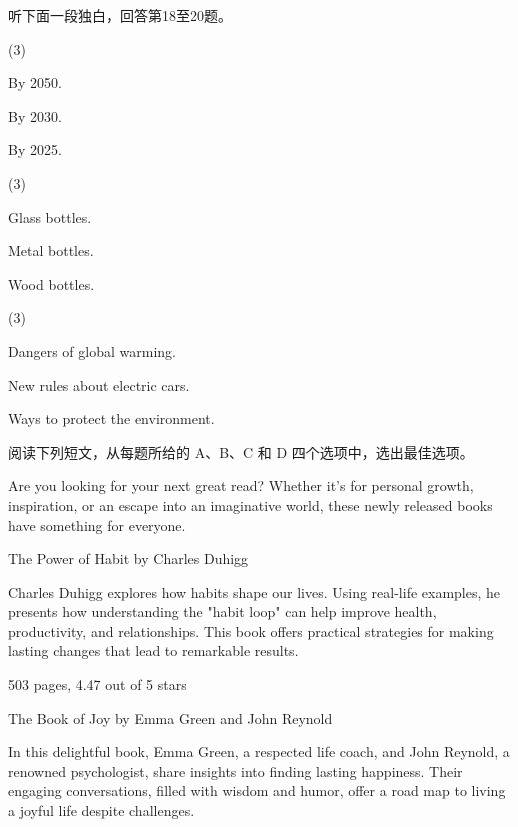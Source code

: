 \documentclass{英语试卷}
\begin{document}
\par 听下面一段独白，回答第18至20题。\par
{}
\begin{choices}(3)
  \item By 2050.
  \item By 2030.
  \item By 2025.
\end{choices}
\begin{choices}(3)
  \item Glass bottles.
  \item Metal bottles.
  \item Wood bottles.
\end{choices}
\begin{choices}(3)
  \item Dangers of global warming.
  \item New rules about electric cars.
  \item Ways to protect the environment.
\end{choices}
\par 阅读下列短文，从每题所给的 A、B、C 和 D 四个选项中，选出最佳选项。\par
{}
\par Are you looking for your next great read? Whether it's for personal growth, inspiration, or an escape into an imaginative world, these newly released books have something for everyone.\par
\par The Power of Habit by Charles Duhigg\par
\par Charles Duhigg explores how habits shape our lives. Using real-life examples, he presents how understanding the "habit loop" can help improve health, productivity, and relationships. This book offers practical strategies for making lasting changes that lead to remarkable results.\par
\par 503 pages, 4.47 out of 5 stars\par
\par The Book of Joy by Emma Green and John Reynold\par
\par In this delightful book, Emma Green, a respected life coach, and John Reynold, a renowned psychologist, share insights into finding lasting happiness. Their engaging conversations, filled with wisdom and humor, offer a road map to living a joyful life despite challenges.\par
\end{document}
